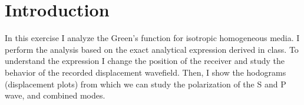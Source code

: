 \section{Introduction}
In this exercise I analyze the Green's function for isotropic homogeneous media. I perform
the analysis based on the exact analytical expression derived in class. To understand the
expression I change the position of the receiver and study the behavior of the recorded displacement wavefield.
Then, I show the hodograms (displacement plots) from which we can study the polarization of the 
S and P wave, and combined modes.  